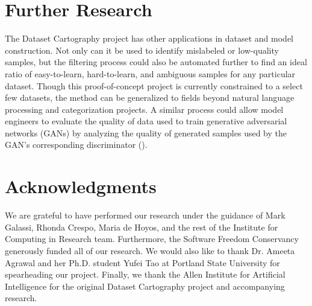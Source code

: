 \documentclass[11pt, a4paper, twocolumn]{article}
\begin{document}
	\section{Further Research}
	
	The Dataset Cartography project has other applications in dataset and model construction. Not only can it be used to identify mislabeled or low-quality samples, but the filtering process could also be automated further to find an ideal ratio of easy-to-learn, hard-to-learn, and ambiguous samples for any particular dataset. Though this proof-of-concept project is currently constrained to a select few datasets, the method can be generalized to fields beyond natural language processing and categorization projects. A similar process could allow model engineers to evaluate the quality of data used to train generative adversarial networks (GANs) by analyzing the quality of generated samples used by the GAN's corresponding discriminator (\cite{1406.2661}).
	
	\section{Acknowledgments}
	
	We are grateful to have performed our research under the guidance of Mark Galassi, Rhonda Crespo, Maria de Hoyos, and the rest of the Institute for Computing in Research team. Furthermore, the Software Freedom Conservancy generously funded all of our research. We would also like to thank Dr. Ameeta Agrawal and her Ph.D. student Yufei Tao at Portland State University for spearheading our project. Finally, we thank the Allen Institute for Artificial Intelligence for the original Dataset Cartography project and accompanying research.
	
	
	
	\nocite{*}
	
	\printbibliography[title={Bibliography}]
	
\end{document}
